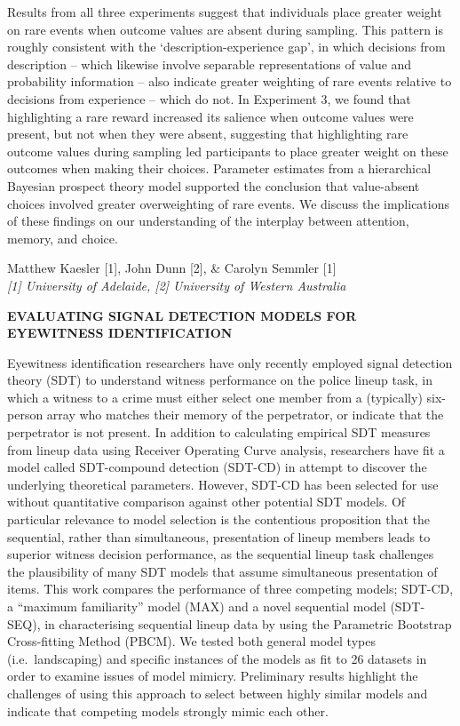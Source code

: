 \documentclass[]{article}
\begin{document}
Results from all three experiments suggest that individuals place
greater weight on rare events when outcome values are absent during
sampling. This pattern is roughly consistent with the
`description-experience gap', in which decisions from description --
which likewise involve separable representations of value and
probability information -- also indicate greater weighting of rare
events relative to decisions from experience -- which do not. In
Experiment 3, we found that highlighting a rare reward increased its
salience when outcome values were present, but not when they were
absent, suggesting that highlighting rare outcome values during sampling
led participants to place greater weight on these outcomes when making
their choices. Parameter estimates from a hierarchical Bayesian prospect
theory model supported the conclusion that value-absent choices involved
greater overweighting of rare events. We discuss the implications of
these findings on our understanding of the interplay between attention,
memory, and choice.\\
\pagebreak  

Matthew Kaesler {[}1{]}, John Dunn {[}2{]}, \& Carolyn Semmler {[}1{]}\\
\emph{{[}1{]} University of Adelaide, {[}2{]} University of Western
Australia}

\textbf{EVALUATING SIGNAL DETECTION MODELS FOR EYEWITNESS
IDENTIFICATION}

Eyewitness identification researchers have only recently employed signal
detection theory (SDT) to understand witness performance on the police
lineup task, in which a witness to a crime must either select one member
from a (typically) six-person array who matches their memory of the
perpetrator, or indicate that the perpetrator is not present. In
addition to calculating empirical SDT measures from lineup data using
Receiver Operating Curve analysis, researchers have fit a model called
SDT-compound detection (SDT-CD) in attempt to discover the underlying
theoretical parameters. However, SDT-CD has been selected for use
without quantitative comparison against other potential SDT models. Of
particular relevance to model selection is the contentious proposition
that the sequential, rather than simultaneous, presentation of lineup
members leads to superior witness decision performance, as the
sequential lineup task challenges the plausibility of many SDT models
that assume simultaneous presentation of items. This work compares the
performance of three competing models; SDT-CD, a ``maximum familiarity''
model (MAX) and a novel sequential model (SDT-SEQ), in characterising
sequential lineup data by using the Parametric Bootstrap Cross-fitting
Method (PBCM). We tested both general model types (i.e.~landscaping) and
specific instances of the models as fit to 26 datasets in order to
examine issues of model mimicry. Preliminary results highlight the
challenges of using this approach to select between highly similar
models and indicate that competing models strongly mimic each other.\\
\pagebreak  
\end{document}
